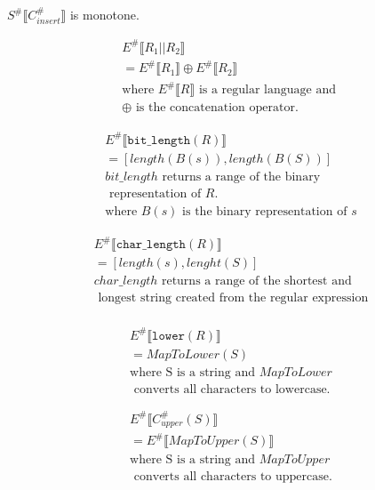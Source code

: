 \begin{lemma}
    $S^\# \llbracket C_{insert}^\# \rrbracket$ is monotone.
\end{lemma}

\begin{align*}
    E^\# \llbracket R_1 \texttt{||} R_2 \rrbracket \\
    = E^\# \llbracket R_1 \rrbracket \oplus  E^\# \llbracket R_2 \rrbracket \\
    \text{where } E^\# \llbracket R \rrbracket \text{ is a regular language and }\\
     \oplus \text{ is the concatenation operator.}
\end{align*}

\begin{align*}
    E^\# \llbracket \texttt{bit\_length} (R) \rrbracket \\
    =  [length(B(s)), length(B(S))] \\
    bit\_length \text{ returns a range of the binary} \\
    \text{ representation of } R. \\
    \text{where } B(s) \text{ is the binary representation of }s
\end{align*}

\begin{align*}
    E^\# \llbracket \texttt{char\_length} (R) \rrbracket \\
    =  [length(s), lenght(S)] \\
    char\_length \text{ returns a range of the shortest and} \\
    \text{ longest string created from the regular expression} \\
\end{align*}

\begin{align*}
    E^\# \llbracket \texttt{lower} (R) \rrbracket \\
    =  MapToLower (S) \\
    \text{where S is a string and } MapToLower \\
    \text{ converts all characters to lowercase.}
\end{align*}

\begin{align*}
    E^\# \llbracket C_{upper}^\# (S) \rrbracket \\
    = E^\# \llbracket MapToUpper (S) \rrbracket \\
    \text{where S is a string and } MapToUpper \\
    \text{ converts all characters to uppercase.}
\end{align*}

